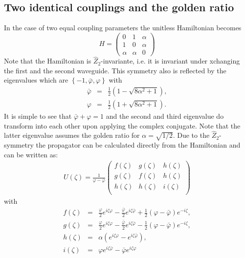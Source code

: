 \documentclass[9pt,twocolumn,twoside]{osajnl}
\begin{document}
\subsection{Two identical couplings and the golden ratio}
In the case of two equal coupling parameters the unitless Hamiltonian becomes
\begin{equation}
H=\left( \begin{array}{ccc}
0 & 1 & \alpha \\
1 & 0 & \alpha \\
\alpha & \alpha & 0 \end{array} \right)	 
\end{equation}
Note that the Hamiltonian is  $\hat{Z}_2$-invariante, i.e. it is invariant under xchanging the first and the second waveguide.
This symmetry also is reflected by the eigenvalues which are  $\left\{-1, \bar{\varphi}, \varphi  \right\}$ with
\begin{eqnarray}
\bar{\varphi} &=& \frac{1}{2} \left(1-\sqrt{8 \alpha ^2+1}\right),\\
\varphi &=& \frac{1}{2} \left( 1 + \sqrt{8 \alpha ^2+1} \right).
\end{eqnarray}
It is simple to see that $\bar{\varphi} + \varphi = 1$ and the second and third eigenvalue do transform into 
each other upon applying the complex conjugate. Note that the latter eigenvalue 
assumes the golden ratio for $\alpha = \sqrt{1/2}$.
Due to the $\hat{Z}_2$-symmetry the propagator can be calculated directly from the Hamiltonian and can be written as:
\begin{eqnarray}
U(\zeta) = \frac{1}{\varphi -\bar{\varphi}} \left(
\begin{array}{ccc}
f(\zeta) & g(\zeta) &  h(\zeta)\\
g(\zeta) & f(\zeta) & h(\zeta) \\
h(\zeta) & h(\zeta) & i(\zeta) \\
\end{array}
\right)\label{eq:prop2}
\end{eqnarray}
 with
 \begin{eqnarray}
f(\zeta) &=& \frac{\varphi}{2} e^{i \zeta \varphi} -\frac{\bar{\varphi}}{2} e^{i \zeta \bar{\varphi} }
 + \frac{1}{2} \left( \varphi -\bar{\varphi} \right) e^{-i \zeta}, \label{eq:ticF1}\\
g(\zeta) &=& \frac{\varphi}{2} e^{i \zeta \varphi } - \frac{\bar{\varphi}}{2} e^{i \zeta \bar{\varphi} } - \frac{1}{2} \left( \varphi -\bar{\varphi}\right)  e^{-i \zeta}, \\
h(\zeta) &=& \alpha \left(  e^{i \zeta \varphi }  -  e^{i \zeta \bar{\varphi} } \right),\\
i(\zeta) &=&   \varphi e^{i \zeta \bar{\varphi} } - \bar{\varphi}  e^{i \zeta \varphi } \label{eq:ticF2} 
\end{eqnarray}
\end{document}
